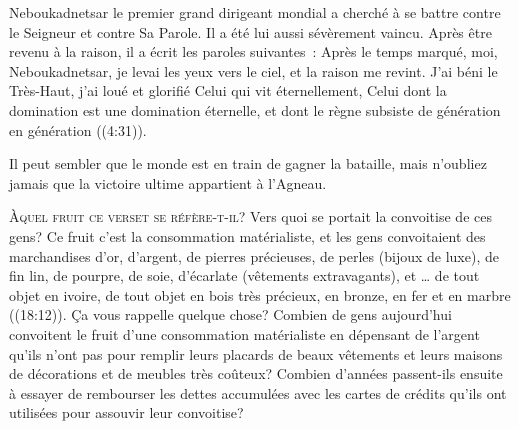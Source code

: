 
Neboukadnetsar \ocadr le premier grand dirigeant mondial \fcadr{}
 a cherché à se battre contre le Seigneur et contre Sa Parole.
 Il a été lui aussi sévèrement vaincu. Après être revenu à la raison,
 il a écrit les paroles suivantes~:
 \og Après le temps marqué, moi, Neboukadnetsar,
 je levai les yeux vers le ciel, et la raison me revint.
 J'ai béni le Très-Haut, j'ai loué et glorifié Celui qui vit éternellement,
 Celui dont la domination est une domination éternelle,
 et dont le règne subsiste de génération en génération \fg{}
 ((4:31)).

Il peut sembler que le monde est en train de gagner la bataille,
 mais n'oubliez jamais que la victoire ultime appartient à l'Agneau.

\dvrule






\lettrine{À}{quel fruit ce verset se réfère-t-il?}
 Vers quoi se portait la convoitise de ces gens?
 Ce fruit c'est la consommation matérialiste, et les gens convoitaient
 \og des marchandises d'or, d'argent, de pierres précieuses, de perles \fg{}
 (bijoux de luxe), \og de fin lin, de pourpre, de soie, d'écarlate \fg{}
 (vêtements extravagants), et \og \dots{} de tout objet en ivoire,
 de tout objet en bois très précieux, en bronze, en fer et en marbre \fg{}
 ((18:12)).
 Ça vous rappelle quelque chose? Combien de gens aujourd'hui convoitent
 le fruit d'une consommation matérialiste en dépensant de l'argent
 qu'ils n'ont pas pour remplir leurs placards de beaux vêtements
 et leurs maisons de décorations et de meubles très coûteux?
 Combien d'années passent-ils ensuite à essayer de rembourser
 les dettes accumulées avec les cartes de crédits
 qu'ils ont utilisées pour assouvir leur convoitise?

